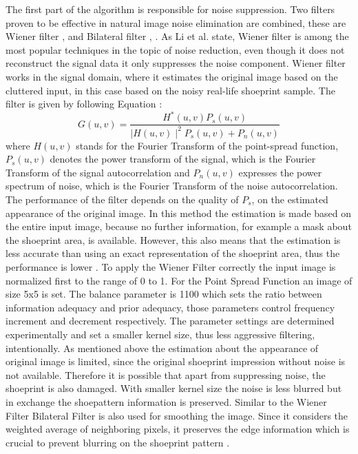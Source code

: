 \documentclass[draft,final]{vutinfth} %
\begin{document}
\par
The first part of the algorithm is responsible for noise suppression.
Two filters proven to be effective in natural image noise elimination are combined, these are Wiener filter \cite{li2014rapid}, \cite{chatterjee2011patch} and Bilateral filter \cite{zhang2016simultaneous}, \cite{huang2013self}.
As Li et al. \cite{li2014rapid} state, Wiener filter is among the most popular techniques in the topic of noise reduction, even though it does not reconstruct the signal data it only suppresses the noise component.
Wiener filter works in the signal domain, where it estimates the original image based on the cluttered input, in this case based on the noisy real-life shoeprint sample. 
The filter is given by following Equation \cite{Win}:
\[ G(u, v) = \frac{H^*(u,v) P_s(u, v)}{\mid H(u,v)\mid ^2 P_s (u, v) + P_n (u, v)}  \]
where $H(u,v)$ stands for the Fourier Transform of the point-spread function, $P_s (u,v)$ denotes the power transform of the signal, which is the Fourier Transform of the signal autocorrelation and $P_n(u,v)$ expresses the power spectrum of noise, which is the Fourier Transform of the noise autocorrelation.
The performance of the filter depends on the quality of $P_s$, on the estimated appearance of the original image.
In this method the estimation is made based on the entire input image, because no further information, for example a mask about the shoeprint  area, is available.
However, this also means that the estimation is less accurate than using an exact representation of the shoeprint area, thus the performance is lower \cite{chatterjee2011patch}.
To apply the Wiener Filter correctly the input image is normalized first to the range of 0 to 1.
For the Point Spread Function an image of size 5x5 is set.
The balance parameter is 1100 which sets the ratio between information adequacy and prior adequacy, those parameters control frequency increment and decrement respectively.
The parameter settings are determined experimentally and set a smaller kernel size, thus less aggressive filtering, intentionally.
As mentioned above the estimation about the appearance of original image is limited, since the original shoeprint impression without noise is not available.
Therefore it is possible that apart from suppressing noise, the shoeprint is also damaged.
With smaller kernel size the noise is less blurred but in exchange the shoepattern information is preserved.
Similar to the Wiener Filter Bilateral Filter is also used for smoothing the image.
Since it considers the weighted average of neighboring pixels, it preserves the edge information which is crucial to prevent blurring on the shoeprint pattern \cite{elad2002origin}. 
\end{document}
